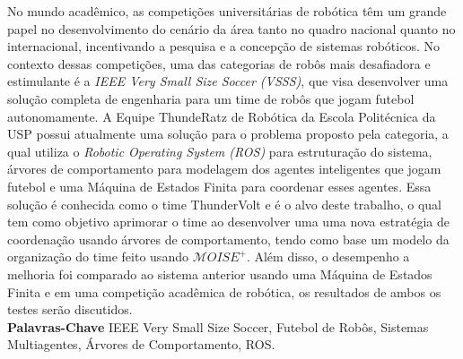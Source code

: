 \def \MOISEp {$\mathcal{M}OISE^+$}

\begin{resumo}
    No mundo acadêmico, as competições universitárias de robótica têm um grande papel no desenvolvimento do cenário da área tanto no quadro nacional quanto no internacional, incentivando a pesquisa e a concepção de sistemas robóticos. No contexto dessas competições, uma das categorias de robôs mais desafiadora e estimulante é a \textit{IEEE Very Small Size Soccer (VSSS)}, que visa desenvolver uma solução completa de engenharia para um time de robôs que jogam futebol autonomamente. A Equipe ThundeRatz de Robótica da Escola Politécnica da USP possui atualmente uma solução para o problema proposto pela categoria, a qual utiliza o \textit{Robotic Operating System (ROS)} para estruturação do sistema, árvores de comportamento para modelagem dos agentes inteligentes que jogam futebol e uma Máquina de Estados Finita para coordenar esses agentes. Essa solução é conhecida como o time ThunderVolt e é o alvo deste trabalho, o qual tem como objetivo aprimorar o time ao desenvolver uma uma nova estratégia de coordenação usando árvores de comportamento, tendo como base um modelo da organização do time feito usando \MOISEp. Além disso, o desempenho a melhoria foi comparado ao sistema anterior usando uma Máquina de Estados Finita e em uma competição acadêmica de robótica, os resultados de ambos os testes serão discutidos.
    \\[3\baselineskip]
    \textbf{Palavras-Chave} IEEE Very Small Size Soccer, Futebol de Robôs, Sistemas Multiagentes, Árvores de Comportamento, ROS.
\end{resumo}
